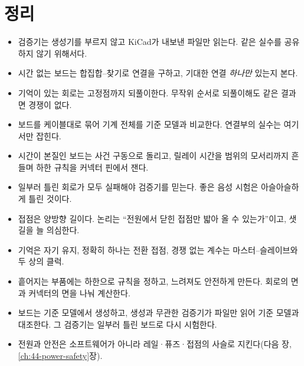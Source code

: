 \section{정리}

\begin{itemize}
\item 검증기는 생성기를 부르지 않고 KiCad가 내보낸 파일만 읽는다. 같은 실수를 공유하지 않기 위해서다.
\item 시간 없는 보드는 합집합--찾기로 연결을 구하고, 기대한 연결 \emph{하나만} 있는지 본다.
\item 기억이 있는 회로는 고정점까지 되풀이한다. 무작위 순서로 되풀이해도 같은 결과면 경쟁이 없다.
\item 보드를 케이블대로 묶어 기계 전체를 기준 모델과 비교한다. 연결부의 실수는 여기서만 잡힌다.
\item 시간이 본질인 보드는 사건 구동으로 돌리고, 릴레이 시간을 범위의 모서리까지 흔들며 하한 규칙을 커넥터 핀에서
잰다.
\item 일부러 틀린 회로가 모두 실패해야 검증기를 믿는다. 좋은 음성 시험은 아슬아슬하게 틀린 것이다.
\end{itemize}

\begin{keybox}[title={릴레이 회로와 보드에서 쓴 방법들}]
\begin{itemize}
\item 접점은 양방향 길이다. 논리는 ``전원에서 닫힌 접점만 밟아 올 수 있는가''이고, 샛길을 늘 의심한다.
\item 기억은 자기 유지, 정확히 하나는 전환 접점, 경쟁 없는 계수는 마스터--슬레이브와 두 상의 클럭.
\item 흩어지는 부품에는 하한으로 규칙을 정하고, 느려져도 안전하게 만든다. 회로의 면과 커넥터의 면을 나눠 계산한다.
\item 보드는 기준 모델에서 생성하고, 생성과 무관한 검증기가 파일만 읽어 기준 모델과 대조한다. 그 검증기는 일부러
틀린 보드로 다시 시험한다.
\item 전원과 안전은 소프트웨어가 아니라 레일·퓨즈·접점의 사슬로 지킨다(다음 장, \ref{ch:44-power-safety}장).
\end{itemize}
\end{keybox}
